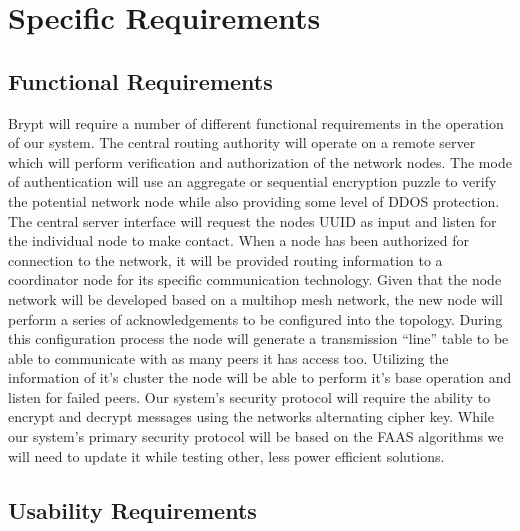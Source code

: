 \documentclass[tikz,a4paper,titlepage]{article}
\begin{document}





\section{Specific Requirements}

\subsection{Functional Requirements}

Brypt will require a number of different functional requirements in the operation of our system. The central routing authority will operate on a remote server which will perform verification and authorization of the network nodes. The mode of authentication will use an aggregate or sequential encryption puzzle to verify the potential network node while also providing some level of DDOS protection. The central server interface will request the nodes UUID as input and listen for the individual node to make contact. When a node has been authorized for connection to the network, it will be provided routing information to a coordinator node for its specific communication technology. Given that the node network will be developed based on a multihop mesh network, the new node will perform a series of acknowledgements to be configured into the topology. During this configuration process the node will generate a transmission “line” table to be able to communicate with as many peers it has access too. Utilizing the information of it’s cluster the node will be able to perform it’s base operation and listen for failed peers. Our system's security protocol will require the ability to encrypt and decrypt messages using the networks alternating cipher key. While our system's primary security protocol will be based on the FAAS algorithms we will need to update it while testing other, less power efficient solutions. 

\subsection{Usability Requirements} %
\end{document}
